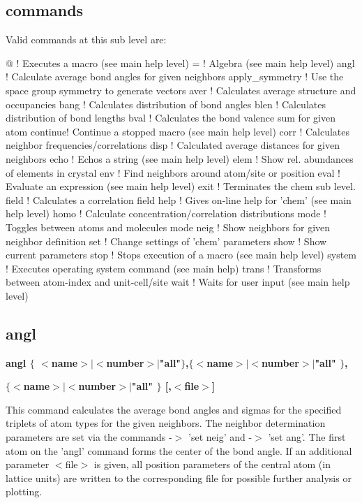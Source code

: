 \subsection*{commands}
Valid commands at this sub level are: 
\par
\begin{MacVerbatim}
@       ! Executes a macro (see main help level)
=       ! Algebra (see main help level)
angl    ! Calculate average bond angles for given neighbors
apply_symmetry ! Use the space group symmetry to generate vectors
aver    ! Calculates average structure and occupancies
bang    ! Calculates distribution of bond angles
blen    ! Calculates distribution of bond lengths
bval    ! Calculates the bond valence sum for given atom
continue! Continue a stopped macro (see main help level)
corr    ! Calculates neighbor frequencies/correlations
disp    ! Calculated average distances for given neighbors
echo    ! Echos a string (see main help level)
elem    ! Show rel. abundances of elements in crystal
env     ! Find neighbors around atom/site or position
eval    ! Evaluate an expression (see main help level)
exit    ! Terminates the chem sub level.
field   ! Calculates a correlation field
help    ! Gives on-line help for 'chem' (see main help level)
homo    ! Calculate concentration/correlation distributions
mode    ! Toggles between atoms and molecules mode
neig    ! Show neighbors for given neighbor definition
set     ! Change settings of 'chem' parameters
show    ! Show current parameters
stop    ! Stops execution of a macro (see main help level)
system  ! Executes operating system command (see main help)
trans   ! Transforms between atom-index and unit-cell/site
wait    ! Waits for user input (see main help level)
\end{MacVerbatim}
\subsection*{angl}
{\bf angl $ \{$ $ <$name$> $$| $$ <$number$> $$| $"all"$\} $,$ \{$$ <$name$> $$| $$ <$number$> $$| $"all" $\} $, \par }
{\bf      $ \{$$ <$name$> $$| $$ <$number$> $$| $"all" $\} $ [,$ <$file$> $] \par }
\par
\vspace{3pt}
This command calculates the average bond angles and sigmas for the 
specified triplets of atom types for the given neighbors. The neighbor 
determination parameters are set via the commands -$> $ 'set neig' and 
-$> $ 'set ang'. The first atom on the 'angl' command forms the center of 
the bond angle. If an additional parameter $ <$file$> $ is given, all position 
parameters of the central atom (in lattice units) are written to the 
corresponding file for possible further analysis or plotting. 
